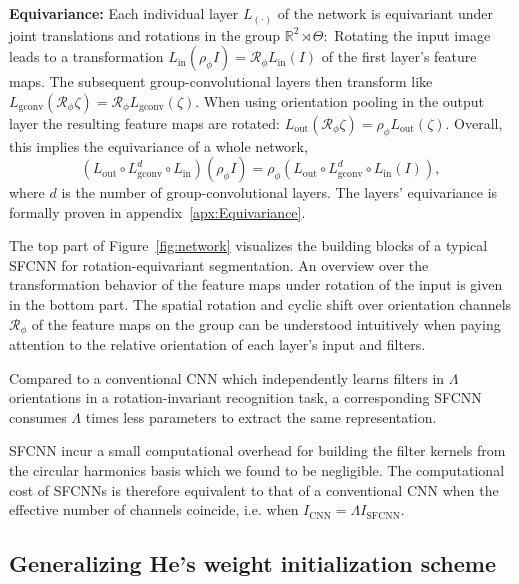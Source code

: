 \documentclass[10pt,twocolumn,letterpaper]{article}
\newcommand{\myparagraph}[1]{\vspace*{1ex}\noindent\textbf{#1}}
\begin{document}
\myparagraph{Equivariance:}
Each individual layer $L_{(\cdot)}$ of the network is equivariant under joint translations and rotations in the group $\mathbb{R}^2\rtimes\Theta:$
Rotating the input image leads to a transformation
$L_{\text{in}}(\rho_\phi I) = \mathcal{R}_\phi L_{\text{in}}(I)$
of the first layer's feature maps.
The subsequent group-convolutional layers then transform like
$L_{\text{gconv}}(\mathcal{R}_\phi \zeta) = \mathcal{R}_\phi L_{\text{gconv}}(\zeta).$
When using orientation pooling in the output layer the resulting feature maps are rotated:
$L_{\text{out}}(\mathcal{R}_\phi \zeta) = \rho_\phi L_{\text{out}}(\zeta).$
Overall, this implies the equivariance of a whole network,
\[
	\left(L_{\text{out}} \circ L_{\text{gconv}}^d \circ L_{\text{in}}\right)(\rho_\phi I) = \rho_\phi \left(L_{\text{out}} \circ L_\text{gconv}^d \circ L_{\text{in}}(I)\right),
\]
where $d$ is the number of group-convolutional layers.
The layers' equivariance is formally proven in appendix~\ref{apx:Equivariance}.

The top part of Figure~\ref{fig:network} visualizes the building blocks of a typical \mbox{SFCNN} for rotation-equivariant segmentation.
An overview over the transformation behavior of the feature maps under rotation of the input is given in the bottom part.
The spatial rotation and cyclic shift over orientation channels $\mathcal{R}_\phi$ of the feature maps on the group can be understood intuitively when paying attention to the relative orientation of each layer's input and filters.

Compared to a conventional CNN which independently learns filters in $\Lambda$ orientations in a rotation-invariant recognition task, a corresponding \mbox{SFCNN} consumes $\Lambda$ times less parameters to extract the same representation.

SFCNN incur a small computational overhead for building the filter kernels from the circular harmonics basis which we found to be negligible.
The computational cost of SFCNNs is therefore equivalent to that of a conventional CNN when the effective number of channels coincide, i.e. when $I_\text{CNN}=\Lambda I_\text{SFCNN}.$


\subsection{Generalizing He's weight initialization scheme}\label{sec:weightInitialization}
\end{document}
